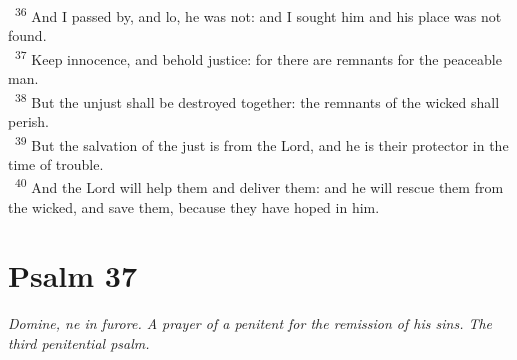\documentclass[a5paper,12pt]{article}
\begin{document}
\begin{multicols*}{2}
~\textsuperscript{36} And I passed by, and lo, he was not: and I sought him and his place was not found.\\
~\textsuperscript{37} Keep innocence, and behold justice: for there are remnants for the peaceable man.\\
~\textsuperscript{38} But the unjust shall be destroyed together: the remnants of the wicked shall perish.\\
~\textsuperscript{39} But the salvation of the just is from the Lord, and he is their protector in the time of trouble.\\
~\textsuperscript{40} And the Lord will help them and deliver them: and he will rescue them from the wicked, and save them, because they have hoped in him.\\

\section{Psalm 37}
\label{sec:org1dc187c}
\emph{Domine, ne in furore. A prayer of a penitent for the remission of his sins. The third penitential psalm.}\\


\end{multicols*}
\end{document}
